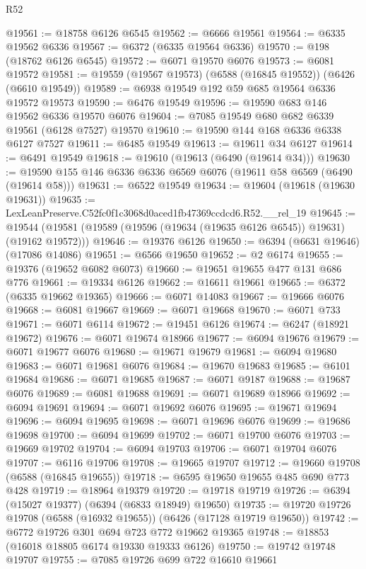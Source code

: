 \begin{lexlean}{R52}
\begin{coremodule}
@19561 := @18758 @6126 @6545
@19562 := @6666 @19561
@19564 := @6335 @19562 @6336
@19567 := @6372 (@6335 @19564 @6336)
@19570 := @198 (@18762 @6126 @6545)
@19572 := @6071 @19570 @6076
@19573 := @6081 @19572
@19581 := @19559 (@19567 @19573) (@6588 (@16845 @19552)) (@6426 (@6610 @19549))
@19589 := @6938 @19549 @192 @59 @685 @19564 @6336 @19572 @19573
@19590 := @6476 @19549
@19596 := @19590 @683 @146 @19562 @6336 @19570 @6076
@19604 := @7085 @19549 @680 @682 @6339 @19561 (@6128 @7527) @19570
@19610 := @19590 @144 @168 @6336 @6338 @6127 @7527
@19611 := @6485 @19549
@19613 := @19611 @34 @6127
@19614 := @6491 @19549
@19618 := @19610 (@19613 (@6490 (@19614 @34)))
@19630 := @19590 @155 @146 @6336 @6336 @6569 @6076 (@19611 @58 @6569 (@6490 (@19614 @58)))
@19631 := @6522 @19549
@19634 := @19604 (@19618 (@19630 @19631))
@19635 := LexLeanPreserve.C52fc0f1c3068d0aced1fb47369ccdcd6.R52.__rel_19
@19645 := @19544 (@19581 (@19589 (@19596 (@19634 (@19635 @6126 @6545)) @19631) (@19162 @19572)))
@19646 := @19376 @6126
@19650 := @6394 (@6631 @19646) (@17086 @14086)
@19651 := @6566 @19650
@19652 := @2 @6174
@19655 := @19376 (@19652 @6082 @6073)
@19660 := @19651 @19655 @477 @131 @686 @776
@19661 := @19334 @6126
@19662 := @16611 @19661
@19665 := @6372 (@6335 @19662 @19365)
@19666 := @6071 @14083
@19667 := @19666 @6076
@19668 := @6081 @19667
@19669 := @6071 @19668
@19670 := @6071 @733
@19671 := @6071 @6114
@19672 := @19451 @6126
@19674 := @6247 (@18921 @19672)
@19676 := @6071 @19674 @18966
@19677 := @6094 @19676
@19679 := @6071 @19677 @6076
@19680 := @19671 @19679
@19681 := @6094 @19680
@19683 := @6071 @19681 @6076
@19684 := @19670 @19683
@19685 := @6101 @19684
@19686 := @6071 @19685
@19687 := @6071 @9187
@19688 := @19687 @6076
@19689 := @6081 @19688
@19691 := @6071 @19689 @18966
@19692 := @6094 @19691
@19694 := @6071 @19692 @6076
@19695 := @19671 @19694
@19696 := @6094 @19695
@19698 := @6071 @19696 @6076
@19699 := @19686 @19698
@19700 := @6094 @19699
@19702 := @6071 @19700 @6076
@19703 := @19669 @19702
@19704 := @6094 @19703
@19706 := @6071 @19704 @6076
@19707 := @6116 @19706
@19708 := @19665 @19707
@19712 := @19660 @19708 (@6588 (@16845 @19655))
@19718 := @6595 @19650 @19655 @485 @690 @773 @428
@19719 := @18964 @19379
@19720 := @19718 @19719
@19726 := @6394 (@15027 @19377) (@6394 (@6833 @18949) @19650)
@19735 := @19720 @19726 @19708 (@6588 (@16932 @19655)) (@6426 (@17128 @19719 @19650))
@19742 := @6772 @19726 @301 @694 @723 @772 @19662 @19365
@19748 := @18853 (@16018 @18805 @6174 @19330 @19333 @6126)
@19750 := @19742 @19748 @19707
@19755 := @7085 @19726 @699 @722 @16610 @19661

\end{coremodule}
\end{lexlean}
